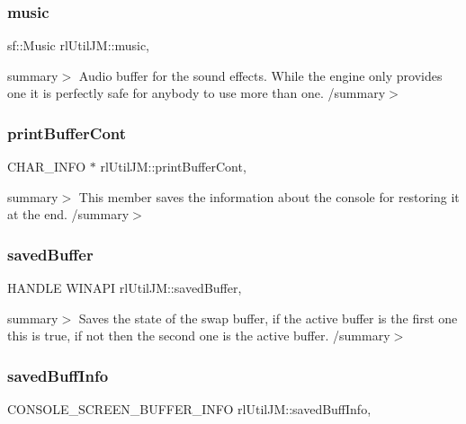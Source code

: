 \subsubsection{\texorpdfstring{music}{music}}
{\footnotesize\ttfamily sf\+::\+Music rl\+Util\+J\+M\+::music\hspace{0.3cm}{\ttfamily [static]}, {\ttfamily [private]}}

summary$>$ Audio buffer for the sound effects. While the engine only provides one it is perfectly safe for anybody to use more than one. /summary$>$ \mbox{\label{classrl_util_j_m_a8d2728630d228078e97a21e833a9023a}} 
\subsubsection{\texorpdfstring{print\+Buffer\+Cont}{printBufferCont}}
{\footnotesize\ttfamily C\+H\+A\+R\+\_\+\+I\+N\+FO $\ast$ rl\+Util\+J\+M\+::print\+Buffer\+Cont\hspace{0.3cm}{\ttfamily [static]}, {\ttfamily [private]}}

summary$>$ This member saves the information about the console for restoring it at the end. /summary$>$ \mbox{\label{classrl_util_j_m_a3e51c90fb6965763d63edd29e57525cf}} 
\subsubsection{\texorpdfstring{saved\+Buffer}{savedBuffer}}
{\footnotesize\ttfamily H\+A\+N\+D\+LE W\+I\+N\+A\+PI rl\+Util\+J\+M\+::saved\+Buffer\hspace{0.3cm}{\ttfamily [static]}, {\ttfamily [private]}}

summary$>$ Saves the state of the swap buffer, if the active buffer is the first one this is true, if not then the second one is the active buffer. /summary$>$ \mbox{\label{classrl_util_j_m_a462fe037cf2e8b6d87c3ba45bcb1d453}} 
\subsubsection{\texorpdfstring{saved\+Buff\+Info}{savedBuffInfo}}
{\footnotesize\ttfamily C\+O\+N\+S\+O\+L\+E\+\_\+\+S\+C\+R\+E\+E\+N\+\_\+\+B\+U\+F\+F\+E\+R\+\_\+\+I\+N\+FO rl\+Util\+J\+M\+::saved\+Buff\+Info\hspace{0.3cm}{\ttfamily [static]}, {\ttfamily [private]}}

